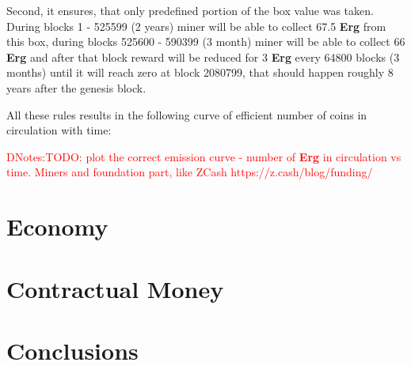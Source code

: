 \documentclass[]{article}
\newcommand{\dnote}[1]{{\textcolor{red}{DNotes:{#1}}}}
\newcommand{\Erg}{\textbf{Erg}}
\begin{document}
\begin{itemize}
        Second, it ensures, that only predefined portion of the box value was taken.
        During blocks 1 - 525599 (2 years) miner will be able to collect 67.5 \Erg{} from this box,
        during blocks 525600 - 590399 (3 month) miner will be able to collect 66 \Erg{} and after
        that block reward will be reduced for 3 \Erg{} every 64800 blocks (3 months) until it will reach zero
        at block 2080799, that should happen roughly 8 years after the genesis block.


    \end{itemize}

    All these rules results in the following curve of efficient number of coins in circulation with time:

    \dnote{TODO: plot the correct emission curve - number of \Erg{} in circulation vs time. Miners and foundation part, like ZCash https://z.cash/blog/funding/}


    \section{Economy}
    \label{sec:economy}


    \section{Contractual Money}
    \label{sec:contractual}



    \section{Conclusions}

    
\end{document}
